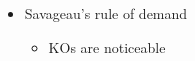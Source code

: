 \begin{itemize}
    \item Savageau's rule of demand~\cite{Shinar2006}
\label{sec:demand_rule}
\begin{itemize}
    \item KOs are noticeable

\end{itemize}
\end{itemize}


